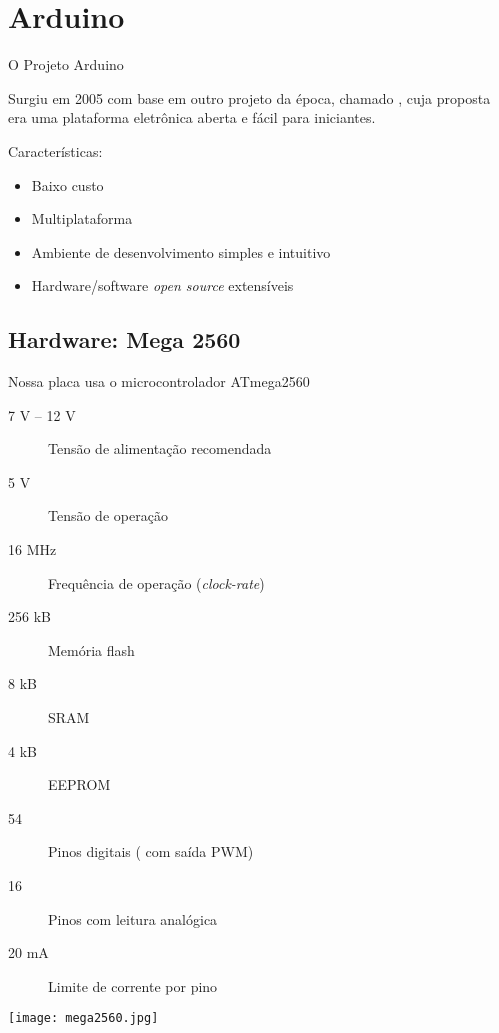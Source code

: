 \section{Arduino}


\begin{frame}{O Projeto Arduino}

	Surgiu em 2005 com base em outro projeto da época, chamado , cuja proposta era uma plataforma eletrônica aberta e fácil para iniciantes.

	\medskip
	Características:
	\begin{itemize}
		\item Baixo custo
		\item Multiplataforma
		\item Ambiente de desenvolvimento simples e intuitivo
		\item Hardware/software \textit{open source} extensíveis
	\end{itemize}

\end{frame}


\subsection{Hardware: Mega 2560}


\begin{frame}{\insertsubsection}

	Nossa placa usa o microcontrolador \textcolor{CustomTeal}{ATmega2560}
	\begin{description}
		\item[7 V -- 12 V] Tensão de alimentação recomendada
		\item[5 V] Tensão de operação
		\item[16 MHz] Frequência de operação (\textit{clock-rate})
		\item[256 kB] Memória flash
		\item[8 kB] SRAM
		\item[4 kB] EEPROM
		\item[54] Pinos digitais ( com saída PWM)
		\item[16] Pinos com leitura analógica
		\item[20 mA] Limite de corrente por pino
	\end{description}

\end{frame}


{ 
\begin{frame}{\insertsubsection}

	\texttt{[image: mega2560.jpg]}

\end{frame}
}


